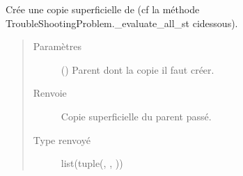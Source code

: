 \documentclass[letterpaper,10pt,french]{sphinxmanual}
\begin{document}
\begin{fulllineitems}
\label{\detokenize{index:DecisionTheoreticTroubleshooting.shallow_copy_parent}}
Crée une copie superficielle de  (cf la méthode
TroubleShootingProblem.\_evaluate\_all\_st ci\sphinxhyphen{}dessous).
\begin{quote}\begin{description}
\item[{Paramètres}] \leavevmode
{} (\sphinxstyleliteralemphasis{\sphinxupquote{(}}\sphinxstyleliteralemphasis{\sphinxupquote{)}}\sphinxstyleliteralemphasis{\sphinxupquote{)}}) \textendash{} Parent dont la copie il faut créer.

\item[{Renvoie}] \leavevmode
{} \textendash{} Copie superficielle du parent passé.

\item[{Type renvoyé}] \leavevmode
list(tuple({\hyperref[\detokenize{index:StrategyTree.NodeST}]{}}, {\hyperref[\detokenize{index:StrategyTree.NodeST}]{}}, {\hyperref[\detokenize{index:StrategyTree.StrategyTree}]{}}))

\end{description}\end{quote}

\end{fulllineitems}

\label{\detokenize{index:module-StrategyTree}}
\end{document}
